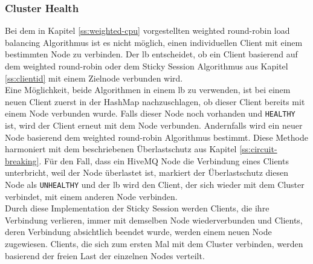 \subsubsection{Cluster Health}
Bei dem in Kapitel \ref{ss:weighted-cpu} vorgestellten weighted round-robin load balancing Algorithmus ist es nicht möglich, einen individuellen Client mit einem bestimmten Node zu verbinden.
Der \acl{lb} entscheidet, ob ein Client basierend auf dem weighted round-robin oder dem Sticky Session Algorithmus aus Kapitel \ref{ss:clientid} mit einem Zielnode verbunden wird.
\\
Eine Möglichkeit, beide Algorithmen in einem \acl{lb} zu verwenden, ist bei einem neuen Client zuerst in der HashMap nachzuschlagen, ob dieser Client bereits mit einem Node verbunden wurde. Falls dieser Node noch vorhanden und \verb|HEALTHY| ist, wird der Client erneut mit dem Node verbunden. Andernfalls wird ein neuer Node basierend dem weighted round-robin Algorithmus bestimmt.
Diese Methode harmoniert mit dem beschriebenen Überlastschutz aus Kapitel \ref{ss:circuit-breaking}. Für den Fall, dass ein HiveMQ Node die Verbindung eines Clients unterbricht, weil der Node überlastet ist, markiert der Überlastschutz diesen Node als \verb|UNHEALTHY| und der \acl{lb} wird den Client, der sich wieder mit dem Cluster verbindet, mit einem anderen Node verbinden.
\\
Durch diese Implementation der Sticky Session werden Clients, die ihre Verbindung verlieren, immer mit demselben Node wiederverbunden und Clients, deren Verbindung absichtlich beendet wurde, werden einem neuen Node zugewiesen. Clients, die sich zum ersten Mal mit dem Cluster verbinden, werden basierend der freien Last der einzelnen Nodes verteilt.
\newpage

